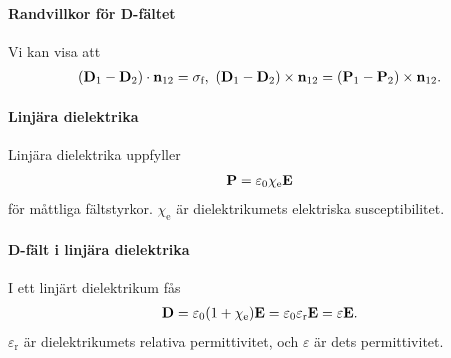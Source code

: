\paragraph{Randvillkor för D-fältet}
Vi kan visa att
\begin{align*}
	(\vb{D}_{1} - \vb{D}_{2})\cdot\vb{n}_{12} = \sigma_{\text{f}},\ (\vb{D}_{1} - \vb{D}_{2})\times\vb{n}_{12} = (\vb{P}_{1} - \vb{P}_{2})\times\vb{n}_{12}.
\end{align*}

\paragraph{Linjära dielektrika}
Linjära dielektrika uppfyller
\begin{align*}
	\vb{P} = \varepsilon_{0}\chi_{\text{e}}\vb{E}
\end{align*}
för måttliga fältstyrkor. $\chi_{\text{e}}$ är dielektrikumets elektriska susceptibilitet.

\paragraph{D-fält i linjära dielektrika}
I ett linjärt dielektrikum fås
\begin{align*}
	\vb{D} = \varepsilon_{0}(1 + \chi_{\text{e}})\vb{E} = \varepsilon_{0}\varepsilon_{\text{r}}\vb{E} = \varepsilon\vb{E}.
\end{align*}
$\varepsilon_{\text{r}}$ är dielektrikumets relativa permittivitet, och $\varepsilon$ är dets permittivitet.

